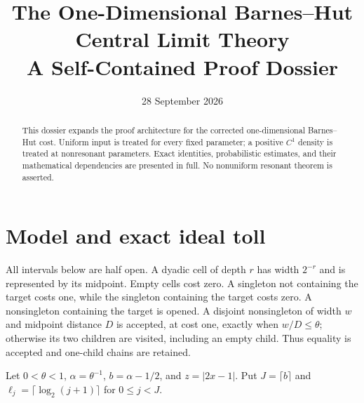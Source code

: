 \documentclass[11pt]{article}
\numberwithin{equation}{section}
\newcommand{\1}{\mathbf 1}\newcommand{\F}{\mathcal F}\newcommand{\D}{\mathcal D}
\begin{document}
\title{The One-Dimensional Barnes--Hut Central Limit Theory\\A Self-Contained Proof Dossier}
\author{}
\date{28 September 2026}
\maketitle
\begin{abstract}
This dossier expands the proof architecture for the corrected one-dimensional
Barnes--Hut cost.  Uniform input is treated for every fixed parameter; a
positive $C^1$ density is treated at nonresonant parameters.  Exact identities,
probabilistic estimates, and their mathematical dependencies are presented
in full.  No nonuniform resonant theorem is asserted.
\end{abstract}
\tableofcontents
\clearpage

\section{Model and exact ideal toll}
All intervals below are half open.  A dyadic cell of depth $r$ has width
$2^{-r}$ and is represented by its midpoint.  Empty cells cost zero.  A
singleton not containing the target costs one, while the singleton containing
the target costs zero.  A nonsingleton containing the target is opened.  A
disjoint nonsingleton of width $w$ and midpoint distance $D$ is accepted, at
cost one, exactly when $w/D\leq\theta$; otherwise its two children are
visited, including an empty child.  Thus equality is accepted and one-child
chains are retained.

Let $0<\theta<1$, $\alpha=\theta^{-1}$, $b=\alpha-1/2$, and
$z=|2x-1|$.  Put $J=\lceil b\rceil$ and
$\ell_j=\lceil\log_2(j+1)\rceil$ for $0\leq j<J$.
\end{document}
